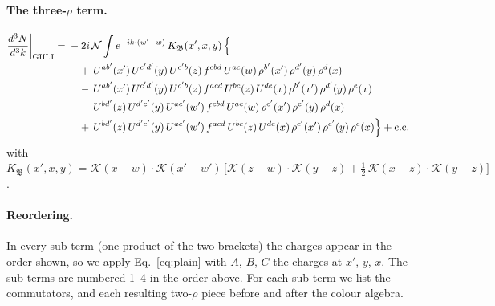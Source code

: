 \documentclass[10pt]{article}
\numberwithin{equation}{section}
\newcommand{\KK}{\mathcal K}
\newcommand{\NN}{\mathcal N}
\begin{document}
\paragraph{The three-$\rho$ term.}
\begin{align}
\frac{d^3N}{d^3k}\bigg|_{\rm GIII.I}={}&-2i\,\NN\int e^{-ik\cdot(w'-w)}\,K_{\mathfrak B}(x',x,y)\,\Big\{\notag\\
&\quad +\,U^{ab'}(x')\,U^{c'd'}(y)\,U^{c'b}(z)\,f^{cbd}\,U^{ac}(w)\,\rho^{b'}(x')\,\rho^{d'}(y)\,\rho^{d}(x)\notag\\
&\quad -\,U^{ab'}(x')\,U^{c'd'}(y)\,U^{c'b}(z)\,f^{acd}\,U^{bc}(z)\,U^{de}(x)\,\rho^{b'}(x')\,\rho^{d'}(y)\,\rho^{e}(x)\notag\\
&\quad -\,U^{bd'}(z)\,U^{d'e'}(y)\,U^{ac'}(w')\,f^{cbd}\,U^{ac}(w)\,\rho^{c'}(x')\,\rho^{e'}(y)\,\rho^{d}(x)\notag\\
&\quad +\,U^{bd'}(z)\,U^{d'e'}(y)\,U^{ac'}(w')\,f^{acd}\,U^{bc}(z)\,U^{de}(x)\,\rho^{c'}(x')\,\rho^{e'}(y)\,\rho^{e}(x)\Big\}+{\rm c.c.}\label{eq:in-GIII.I}
\end{align}
with $K_{\mathfrak B}(x',x,y)=\KK(x-w)\cdot\KK(x'-w')\,\Big[\KK(z-w)\cdot\KK(y-z)+\tfrac12\,\KK(x-z)\cdot\KK(y-z)\Big]$.
\paragraph{Reordering.} In every sub-term (one product of the two brackets) the charges appear in the order shown, so we apply Eq.~\eqref{eq:plain} with $A$, $B$, $C$ the charges at $x'$, $y$, $x$. The sub-terms are numbered 1--4 in the order above. For each sub-term we list the commutators, and each resulting two-$\rho$ piece before and after the colour algebra.
\end{document}
